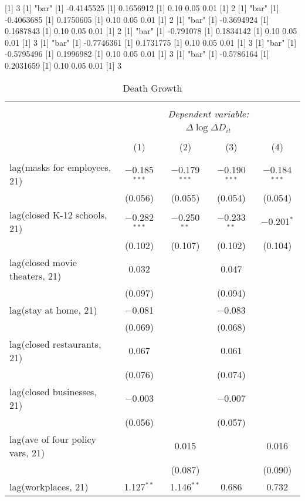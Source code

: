 [1] 3
[1] "bar"
[1] -0.4145525
[1] 0.1656912
[1] 0.10 0.05 0.01
[1] 2
[1] "bar"
[1] -0.4063685
[1] 0.1750605
[1] 0.10 0.05 0.01
[1] 2
[1] "bar"
[1] -0.3694924
[1] 0.1687843
[1] 0.10 0.05 0.01
[1] 2
[1] "bar"
[1] -0.791078
[1] 0.1834142
[1] 0.10 0.05 0.01
[1] 3
[1] "bar"
[1] -0.7746361
[1] 0.1731775
[1] 0.10 0.05 0.01
[1] 3
[1] "bar"
[1] -0.5795496
[1] 0.1996982
[1] 0.10 0.05 0.01
[1] 3
[1] "bar"
[1] -0.5786164
[1] 0.2031659
[1] 0.10 0.05 0.01
[1] 3

\begin{table}[!htbp] \centering 
  \caption{Death Growth} 
  \label{} 
\begin{tabular}{@{\extracolsep{1pt}}lcccc} 
\\[-1.8ex]\hline 
\hline \\[-1.8ex] 
 & \multicolumn{4}{c}{\textit{Dependent variable:}} \\ 
\cline{2-5} 
 & \multicolumn{4}{c}{$\Delta \log \Delta D_{it}$} \\ 
\\[-1.8ex] & (1) & (2) & (3) & (4)\\ 
\hline \\[-1.8ex] 
 lag(masks for employees, 21) & $-$0.185$^{***}$ & $-$0.179$^{***}$ & $-$0.190$^{***}$ & $-$0.184$^{***}$ \\ 
  & (0.056) & (0.055) & (0.054) & (0.054) \\ 
  lag(closed K-12 schools, 21) & $-$0.282$^{***}$ & $-$0.250$^{**}$ & $-$0.233$^{**}$ & $-$0.201$^{*}$ \\ 
  & (0.102) & (0.107) & (0.102) & (0.104) \\ 
  lag(closed movie theaters, 21) & 0.032 &  & 0.047 &  \\ 
  & (0.097) &  & (0.094) &  \\ 
  lag(stay at home, 21) & $-$0.081 &  & $-$0.083 &  \\ 
  & (0.069) &  & (0.068) &  \\ 
  lag(closed restaurants, 21) & 0.067 &  & 0.061 &  \\ 
  & (0.076) &  & (0.074) &  \\ 
  lag(closed businesses, 21) & $-$0.003 &  & $-$0.007 &  \\ 
  & (0.056) &  & (0.057) &  \\ 
  lag(ave of four policy vars, 21) &  & 0.015 &  & 0.016 \\ 
  &  & (0.087) &  & (0.090) \\ 
  lag(workplaces, 21) & 1.127$^{**}$ & 1.146$^{**}$ & 0.686 & 0.732 \\ 

\end{tabular}
\end{table}
